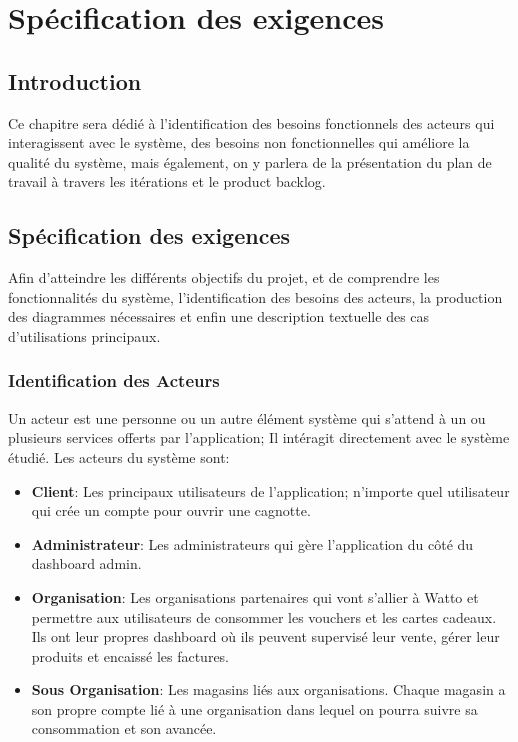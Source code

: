 \documentclass[../main.tex]{subfiles}
\begin{document}
\chapter{Spécification des exigences}
\section{Introduction}
Ce chapitre sera dédié à l'identification des besoins fonctionnels des acteurs qui interagissent avec le système, des besoins non fonctionnelles qui améliore la qualité du système, mais également, on y parlera de la présentation du plan de travail à travers les itérations et le product backlog. 
\section{Spécification des exigences}
Afin d'atteindre les différents objectifs du projet, et de comprendre les fonctionnalités du système, l'identification des besoins des acteurs, la production des diagrammes nécessaires et enfin une description textuelle des cas d'utilisations principaux.  

\subsection{Identification des Acteurs}
Un acteur est une personne ou un autre élément système qui s'attend à un ou plusieurs services offerts par l'application; Il intéragit directement avec le système étudié.
\newline Les acteurs du système sont: 
\begin{itemize}
  \item \textbf{Client}: Les principaux utilisateurs de l'application; n'importe quel utilisateur qui crée un compte pour ouvrir une cagnotte. 
  \item \textbf{Administrateur}: Les administrateurs qui gère l'application du côté du dashboard admin. 
  \item \textbf{Organisation}: Les organisations partenaires qui vont s'allier à Watto et permettre aux utilisateurs de consommer les vouchers et les cartes cadeaux. Ils ont leur propres dashboard où ils peuvent supervisé leur vente, gérer leur produits et encaissé les factures. 
  \item \textbf{Sous Organisation}: Les magasins liés aux organisations. Chaque magasin a son propre compte lié à une organisation dans lequel on pourra suivre sa consommation et son avancée.
\end{itemize}
\newpage
\end{document}
